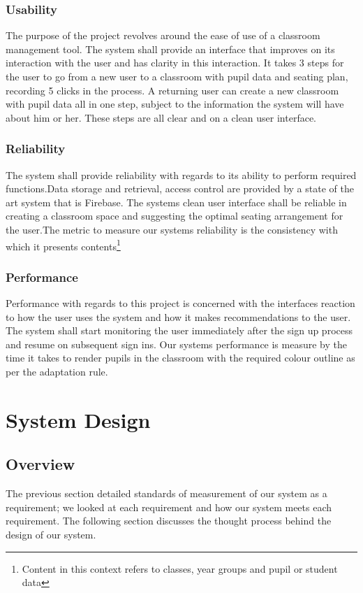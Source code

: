 \subsubsection{Usability}
The purpose of the project revolves around the ease of use of a classroom management tool. The system shall provide an interface that improves on its interaction with the user and has clarity in this interaction. It takes 3 steps for the user to go from a new user to a classroom with pupil data and seating plan, recording 5 clicks in the process. A returning user can create a new classroom with pupil data all in one step, subject to the information the system will have about him or her. These steps are all clear and on a clean user interface. 

\subsubsection{Reliability}
The system shall provide reliability with regards to its ability to perform required functions.Data storage and retrieval, access control are provided by a state of the art system that is Firebase. The systems clean user interface shall be reliable in creating a classroom space and suggesting the optimal seating arrangement for the user.The metric to measure our systems reliability is the consistency with which it presents contents\footnote{Content in this context refers to classes, year groups and pupil or student data} 

\subsubsection{Performance}
Performance with regards to this project is concerned with the interfaces reaction to how the user uses the system and how it makes recommendations to the user. The system shall start monitoring the user immediately after the sign up process and resume on subsequent sign ins. Our systems performance is measure by the time it takes to render pupils in the classroom with the required colour outline as per the adaptation rule.

\section{System Design}

\subsection{Overview}
The previous section detailed standards of measurement of our system as a requirement; we looked at each requirement and how our system meets each requirement. The following section discusses the thought process behind the design of our system.

